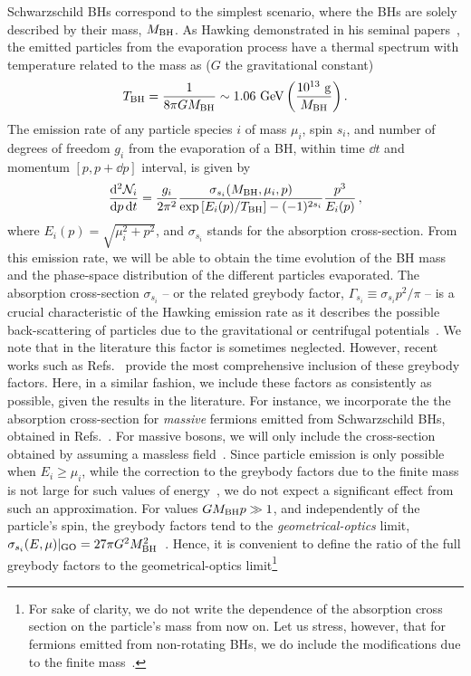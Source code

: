 \documentclass[aps,prd,reprint,twocolumn,preprintnumbers,floatfix,nofootinbib]{revtex4-1}
\newcommand{\be}{\begin{equation}}
\newcommand{\ee}{\end{equation}}
\newcommand{\TBH}{T_{\rm BH}}
\newcommand{\MBH}{M_{\rm BH}}
\begin{document}
Schwarzschild BHs correspond to the simplest scenario, where the BHs are solely described by their mass, $M_{\rm BH}$. As Hawking demonstrated in his seminal papers~\cite{Hawking:1974rv,Hawking:1974sw}, the emitted particles from the evaporation process have a thermal spectrum with temperature related to the mass as ($G$ the gravitational constant)
\begin{align}
 T_{\rm BH} = \frac{1}{8\pi G M_{\rm BH}}\sim 1.06~{\rm GeV}\left(\frac{10^{13}~{\rm g}}{M_{\rm BH}}\right).
\end{align}
The emission rate of any particle species $i$ of mass $\mu_i$, spin $s_i$, and number of degrees of freedom $g_i$ from the evaporation of a BH, within time $\dd{t}$ and momentum $[p,p+\dd{p}]$ interval, is given by
\be\label{eq:BHrate}
\frac{\dd^2 \mathcal{N}_{i}}{\dd p\,\dd t}=\frac{g_i}{2\pi^2}\frac{\sigma_{s_i}(\MBH,\mu_i,p)}{\exp\left[E_i(p)/\TBH\right]-( -1)^{2s_i}}\frac{p^3}{E_i(p)}\,,
\ee
where $E_i(p)=\sqrt{\mu_i^2+p^2}$, and $\sigma_{s_i}$ stands for the absorption cross-section. From this emission rate, we will be able to obtain the time evolution of the BH mass and the phase-space distribution of the different particles evaporated. The absorption cross-section $\sigma_{s_i}$ -- or the related greybody factor, $\Gamma_{s_i}\equiv\sigma_{s_i}p^2/\pi$ -- is a crucial characteristic of the Hawking emission rate as it describes the possible back-scattering of particles due to the gravitational or centrifugal potentials~\cite{Hawking:1974rv,Hawking:1974sw,Page:1976df,Page:1977um}. We note that in the literature this factor is sometimes neglected. However, recent works such as Refs.~\cite{Auffinger:2020afu, Masina:2021zpu} provide the most comprehensive inclusion of these greybody factors. Here, in a similar fashion, we include these factors as consistently as possible, given the results in the literature. For instance, we incorporate the the absorption cross-section for \emph{massive} fermions emitted from Schwarzschild BHs, obtained in Refs.~\cite{Unruh:1976fm,Doran:2005vm}. For massive bosons, we will only include the cross-section obtained by assuming a massless field~\cite{Page:1976df}. Since particle emission is only possible when $E_i \geq \mu_i$, while the correction to the greybody factors due to the finite mass is not large for such values of energy~\cite{MacGibbon:1990zk}, we do not expect a significant effect from such an approximation. For values $G\MBH p\gg 1$, and independently of the particle's spin, the greybody factors tend to the \emph{geometrical-optics} limit, $\sigma_{s_i}(E,\mu)|_{\rm GO}=27\pi G^2\MBH^2$~\cite{Page:1976df,Page:1977um,MacGibbon:1990zk,MacGibbon:1991tj}. Hence, it is convenient to define the ratio of the full greybody factors to the geometrical-optics limit\footnote{For sake of clarity, we do not write the dependence of the absorption cross section on the particle's mass from now on. Let us stress, however, that for fermions emitted from non-rotating BHs, we do include the modifications due to the finite mass~\cite{Doran:2005vm}.}~\cite{Ukwatta:2015iba}
\end{document}
